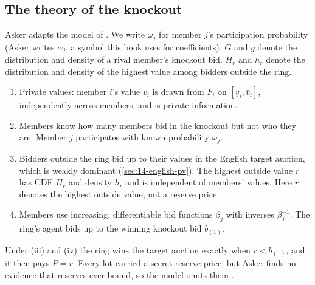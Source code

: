 \subsection{The theory of the knockout}\label{sec:13-asker-theory}

Asker adapts the model of \citet{GrahamMarshallRichard1990}. We write $\omega_j$ for member $j$'s participation
probability (Asker writes $\alpha_j$, a symbol this book uses for coefficients). $G$ and $g$ denote the distribution and density
of a rival member's knockout bid. $H_r$ and $h_r$ denote the distribution and density of the highest value among
bidders outside the ring.

\begin{assumption}\label{asm:13-asker-ipv}
\leavevmode
\begin{enumerate}[label=(\roman*)]
\item Private values: member $i$'s value $v_i$ is drawn from $F_i$ on $[\underline v_i,\bar v_i]$,
independently across members, and is private information.
\item Members know how many members bid in the knockout but not who they are. Member $j$ participates with known
probability $\omega_j$.
\item Bidders outside the ring bid up to their values in the English target auction, which is weakly dominant
(\cref{sec:14-english-pv}). The highest outside value $r$ has CDF $H_r$ and density $h_r$ and is independent of
members' values. Here $r$ denotes the highest outside value, not a reserve price.
\item Members use increasing, differentiable bid functions $\beta_j$ with inverses $\beta_j^{-1}$. The ring's
agent bids up to the winning knockout bid $b_{(1)}$.
\end{enumerate}
\end{assumption}

Under (iii) and (iv) the ring wins the target auction exactly when $r<b_{(1)}$, and it then pays $P=r$. Every
lot carried a secret reserve price, but Asker finds no evidence that reserves ever bound, so the model omits
them \citep[footnote 12]{Asker2010}.

